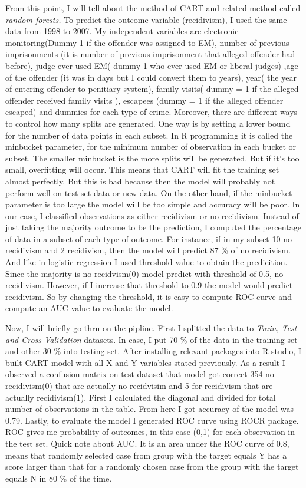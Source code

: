 \documentclass[a4paper,12pt]{article}
\begin{document}
From this point, I will tell about the method of CART and related method called \textit{random forests.} To predict the outcome variable (recidivism), I used the same data from 1998 to 2007. My independent variables are electronic monitoring(Dummy 1 if the offender was assigned to EM), number of previous imprisonments (it is number of previous imprisonment that alleged offender had before), judge ever used EM( dummy 1 who ever used EM or liberal judges) ,age of the offender (it was in days but I could convert them to years), year( the year of entering offender to penitiary system), family visits( dummy = 1 if the alleged offender received family visits ), escapees (dummy = 1 if the alleged offender escaped) and dummies for each type of crime. Moreover, there are different ways to control how many splits are generated. One way is by setting a lower bound for the number of data points in each subset. In R programming it is called the minbucket parameter, for the minimum number of observation in each bucket or subset. The smaller minbucket is the more splits will be generated. But if it's too small, overfitting will occur. This means that CART will fit the training set almost perfectly. But this is bad because then the model will probably not perform well on test set data or new data. On the other hand, if the minbucket parameter is too large the model will be too simple and accuracy will be poor. In our case, I classified observations as either recidivism or no recidivism. Instead of just taking the majority outcome to be the prediction, I  computed the percentage of data in a subset of each type of outcome. For instance, if in my subset 10 no recidivism and 2 recidivism, then the model will predict 87 \% of no recidivism. And like in logistic regression I used threshold value to obtain the predicition.  Since the majority is no recidvism(0) model predict with threshold of 0.5, no recidivism. However, if I increase that threshold to 0.9 the model would predict recidivism. So by changing the threshold, it is easy to compute ROC curve and compute an AUC value to evaluate the model. 

Now, I will briefly go thru on the pipline. First I splitted the data to \textit{Train, Test and Cross Validation} datasets. In case, I put 70 \% of the data in the training set and other 30 \% into testing set. After installing relevant packages into R studio, I built CART model with all X and Y variables stated previously. As a result I observed a confusion matrix on test dataset that model got correct 354 no recidivism(0) that are actually no recidvisim and 5 for recidivism that are actually recidivism(1). First I calculated the diagonal and divided for total number of observations in the table. From here I got accuracy of the model was 0.79. Lastly, to evaluate the model I generated ROC curve using ROCR package. ROC gives me probability of outcomes, in this case (0,1) for each observation in the test set. Quick note about AUC. It is an area under the ROC curve of 0.8, means that randomly selected case from group with the target equals Y has a score larger than that for a randomly chosen case from the group with the target equals N in 80 \% of the time. 
\end{document}
